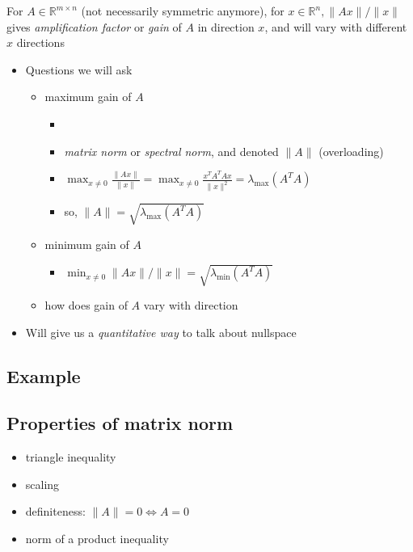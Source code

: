 \documentclass[10pt,letterpaper]{article}
\begin{document}
For $A \in \mathbb{R}^{m\times n}$ (not necessarily symmetric anymore), for $x \in \mathbb{R}^{n}, \|Ax\| / \|x \|$ gives \emph{amplification factor} or \emph{gain} of $A$ in direction $x$, and will vary with different $x$ directions
\begin{itemize}
\item Questions we will ask

\begin{itemize}
\item maximum gain of $A$

\begin{itemize}
\item {}
\item \emph{matrix norm} or \emph{spectral norm}, and denoted $\|A\|$ (overloading)
\item $\displaystyle \max _{x\ne 0} \frac{\|Ax\|}{\|x\|} = \max _{x \ne 0} \frac{x^TA^TAx}{\|x\|^2} = \lambda _{\max} (A ^{T} A)$
\item so, $\|A \|= \sqrt{\lambda _{\max} (A ^{T} A)}$
\end{itemize}

\item minimum gain of $A$

\begin{itemize}
\item $\displaystyle \min _{x\ne 0} \|Ax\| / \|x\| = \sqrt{\lambda _{\min} (A ^{T} A)}$
\end{itemize}

\item how does gain of $A$ vary with direction
\end{itemize}

\item Will give us a \emph{quantitative way} to talk about nullspace
\end{itemize}
\subsection{Example}
\label{sec-15_6}
\subsection{Properties of matrix norm}
\label{sec-15_7}

\begin{itemize}
\item triangle inequality
\item scaling
\item definiteness: $\|A\|= 0 \Leftrightarrow A = 0$
\item norm of a product inequality
\end{itemize}
\end{document}
